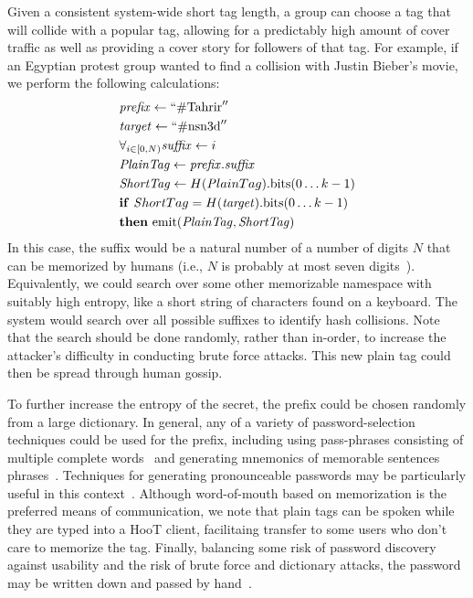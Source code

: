 Given a consistent system-wide short tag length, a group can choose a
tag that will collide with a popular tag, allowing for a predictably
high amount of cover traffic as well as providing a cover story for
followers of that tag. For example, if an Egyptian protest group wanted
to find a collision with Justin Bieber's movie, we perform the following
calculations: 
%
\begin{align*}
& \mathit{prefix} \leftarrow  ``\mathrm{\#Tahrir}'' \\
& \mathit{target} \leftarrow ``\mathrm{\#nsn3d}'' \\
& \forall_{i \in [0, N)}  \mathit{suffix} \leftarrow i \\
& \mathit{PlainTag} \leftarrow  \mathit{prefix}.\mathit{suffix} \\
& \mathit{ShortTag} \leftarrow H({\mathit PlainTag}).\mathrm{bits}(0 \ldots k-1) \\
& \mathbf{if}\ {\mathit ShortTag} = H(\mathit{target}).\mathrm{bits}(0 \ldots k-1)\\
& \mathbf{then}\ \mathrm{emit} (\mathit{PlainTag} , {\mathit{ShortTag}}) 
\end{align*}
%
In this case, the suffix would be a natural number of a number of digits
$N$ that can be memorized by humans (i.e., $N$ is probably at most seven
digits~\cite{miller56}). Equivalently, we could search over some other
memorizable namespace with suitably high entropy, like a short string of
characters found on a keyboard. The system would search over all
possible suffixes to identify hash collisions. Note that the search
should be done randomly, rather than in-order, to increase the
attacker's difficulty in conducting brute force attacks. This new plain
tag could then be spread through human gossip. 

To further increase the entropy of the secret, the prefix could be
chosen randomly from a large dictionary. In general, any of a variety of
password-selection techniques could be used for the prefix, including
using pass-phrases consisting of multiple complete
words~\cite{passphrase} and generating mnemonics of memorable sentences
phrases~\cite{mnemonics}. Techniques for generating pronounceable
passwords may be particularly useful in this
context~\cite{gasser}. Although word-of-mouth based on memorization is
the preferred means of communication, we note that plain tags can be
spoken while they are typed into a HooT client, facilitaing transfer to
some users who don't care to memorize the tag. Finally, balancing some
risk of password discovery against usability and the risk of brute force
and dictionary attacks, the password may be written down and passed by
hand~\cite{written-passwords}.

